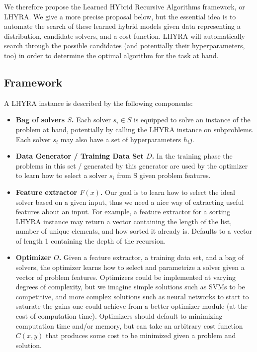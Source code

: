 \documentclass{article}
\begin{document}
We therefore propose the Learned HYbrid Recursive Algorithms framework, or LHYRA. We give a more precise proposal below, but the essential idea is to automate the search of these learned hybrid models given data representing a distribution, candidate solvers, and a cost function. LHYRA will automatically search through the possible candidates (and potentially their hyperparameters, too) in order to determine the optimal algorithm for the task at hand.

\subsection*{Framework}

A LHYRA instance is described by the following components:

\begin{itemize}
	\item \textbf{Bag of solvers $S$.} Each solver $s_i \in S$ is equipped to solve an instance of the problem at hand, potentially by calling the LHYRA instance on subproblems. Each solver $s_i$ may also have a set of hyperparameters $h_ij$. 

	\item \textbf{Data Generator / Training Data Set $D$.} In the training phase the problems in this set / generated by this generator are used by the optimizer to learn how to select a solver $s_i$ from S given problem features.

	\item \textbf{Feature extractor $F(x)$.} Our goal is to learn how to select the ideal solver based on a given input, thus we need a nice way of extracting useful features about an input. For example, a feature extractor for a sorting LHYRA instance may return a vector containing the length of the list, number of unique elements, and how sorted it already is. Defaults to a vector of length 1 containing the depth of the recursion.

	\item \textbf{Optimizer $O$.} Given a feature extractor, a training data set, and a bag of solvers, the optimizer learns how to select and parametrize a solver given a vector of problem features.  Optimizers could be implemented at varying degrees of complexity, but we imagine simple solutions such as SVMs to be competitive, and more complex solutions such as neural networks to start to saturate the gains one could achieve from a better optimizer module (at the cost of computation time). Optimizers should default to minimizing computation time and/or memory, but can take an arbitrary cost function $C(x,y)$ that produces some cost to be minimized given a problem and solution. 
\end{itemize}
\end{document}
